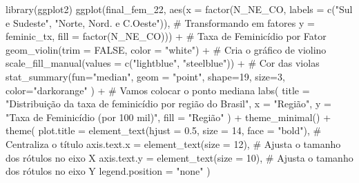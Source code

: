 \documentclass[
  letterpaper,
  DIV=11,
  numbers=noendperiod]{scrreprt}
\newenvironment{Shaded}{\begin{snugshade}}{\end{snugshade}}
\newcommand{\AttributeTok}[1]{\textcolor[rgb]{0.40,0.45,0.13}{#1}}
\newcommand{\CommentTok}[1]{\textcolor[rgb]{0.37,0.37,0.37}{#1}}
\newcommand{\ConstantTok}[1]{\textcolor[rgb]{0.56,0.35,0.01}{#1}}
\newcommand{\DecValTok}[1]{\textcolor[rgb]{0.68,0.00,0.00}{#1}}
\newcommand{\FloatTok}[1]{\textcolor[rgb]{0.68,0.00,0.00}{#1}}
\newcommand{\FunctionTok}[1]{\textcolor[rgb]{0.28,0.35,0.67}{#1}}
\newcommand{\NormalTok}[1]{\textcolor[rgb]{0.00,0.23,0.31}{#1}}
\newcommand{\SpecialCharTok}[1]{\textcolor[rgb]{0.37,0.37,0.37}{#1}}
\newcommand{\StringTok}[1]{\textcolor[rgb]{0.13,0.47,0.30}{#1}}
\begin{document}
\begin{Shaded}
\begin{Highlighting}[]
\FunctionTok{library}\NormalTok{(ggplot2)}
\FunctionTok{ggplot}\NormalTok{(final\_fem\_22, }\FunctionTok{aes}\NormalTok{(}\AttributeTok{x =} \FunctionTok{factor}\NormalTok{(N\_NE\_CO, }\AttributeTok{labels =} \FunctionTok{c}\NormalTok{(}\StringTok{"Sul e Sudeste"}\NormalTok{, }\StringTok{"Norte, Nord. e C.Oeste"}\NormalTok{)),  }\CommentTok{\# Transformando em fatores}
                         \AttributeTok{y =}\NormalTok{ feminic\_tx, }\AttributeTok{fill =} \FunctionTok{factor}\NormalTok{(N\_NE\_CO))) }\SpecialCharTok{+}                                   \CommentTok{\# Taxa de Feminicídio por Fator}
  \FunctionTok{geom\_violin}\NormalTok{(}\AttributeTok{trim =} \ConstantTok{FALSE}\NormalTok{, }\AttributeTok{color =} \StringTok{"white"}\NormalTok{) }\SpecialCharTok{+}                                                        \CommentTok{\# Cria o gráfico de violino}
  \FunctionTok{scale\_fill\_manual}\NormalTok{(}\AttributeTok{values =} \FunctionTok{c}\NormalTok{(}\StringTok{"lightblue"}\NormalTok{, }\StringTok{"steelblue"}\NormalTok{)) }\SpecialCharTok{+}                                           \CommentTok{\# Cor das violas}
  \FunctionTok{stat\_summary}\NormalTok{(}\AttributeTok{fun=}\StringTok{"median"}\NormalTok{, }\AttributeTok{geom =} \StringTok{"point"}\NormalTok{, }\AttributeTok{shape=}\DecValTok{19}\NormalTok{, }\AttributeTok{size=}\DecValTok{3}\NormalTok{, }\AttributeTok{color=}\StringTok{"darkorange"}\NormalTok{  ) }\SpecialCharTok{+}                \CommentTok{\# Vamos colocar o ponto mediana}
  \FunctionTok{labs}\NormalTok{(}
    \AttributeTok{title =} \StringTok{"Distribuição da taxa de feminicídio por região do Brasil"}\NormalTok{,}
    \AttributeTok{x =} \StringTok{"Região"}\NormalTok{,}
    \AttributeTok{y =} \StringTok{"Taxa de Feminicídio (por 100 mil)"}\NormalTok{,}
    \AttributeTok{fill =} \StringTok{"Região"}
\NormalTok{  ) }\SpecialCharTok{+}
  \FunctionTok{theme\_minimal}\NormalTok{() }\SpecialCharTok{+}
  \FunctionTok{theme}\NormalTok{(}
    \AttributeTok{plot.title =} \FunctionTok{element\_text}\NormalTok{(}\AttributeTok{hjust =} \FloatTok{0.5}\NormalTok{, }\AttributeTok{size =} \DecValTok{14}\NormalTok{, }\AttributeTok{face =} \StringTok{"bold"}\NormalTok{),              }\CommentTok{\# Centraliza o título}
    \AttributeTok{axis.text.x =} \FunctionTok{element\_text}\NormalTok{(}\AttributeTok{size =} \DecValTok{12}\NormalTok{),                                         }\CommentTok{\# Ajusta o tamanho dos rótulos no eixo X}
    \AttributeTok{axis.text.y =} \FunctionTok{element\_text}\NormalTok{(}\AttributeTok{size =} \DecValTok{10}\NormalTok{),                                         }\CommentTok{\# Ajusta o tamanho dos rótulos no eixo Y}
    \AttributeTok{legend.position =} \StringTok{"none"}\NormalTok{  )}
\end{Highlighting}
\end{Shaded}
\end{document}
